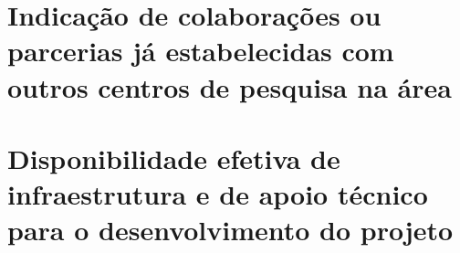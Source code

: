 \documentclass[a4paper,12pt]{article}
\begin{document}




\newpage
\section{Indicação de colaborações ou parcerias já estabelecidas com outros centros de pesquisa na área}
\label{sc:colaboracoes}

\newpage
\section{Disponibilidade efetiva de infraestrutura e de apoio técnico para o desenvolvimento do projeto}
\label{sc:disponibilidade}

\newpage
%


\end{document}
